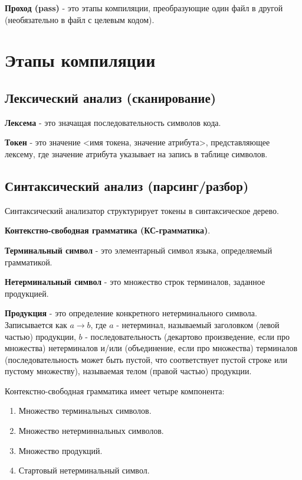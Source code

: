 \documentclass[oneside]{book}
\begin{document}
    \textbf{Проход (pass)} - это этапы компиляции,
    преобразующие один файл в другой
    (необязательно в файл с целевым кодом).

    \section{Этапы компиляции}
    \subsection{Лексический анализ (сканирование)}
    \textbf{Лексема} - это значащая последовательность символов кода.

    \textbf{Токен} - это значение <имя токена, значение атрибута>,
    представляющее лексему, где значение атрибута
    указывает на запись в таблице символов.

    \subsection{Синтаксический анализ (парсинг/разбор)}
    Синтаксический анализатор структурирует токены в синтаксическое дерево.

    \textbf{Контекстно-свободная грамматика (КС-грамматика)}.

    \textbf{Терминальный символ} - это элементарный символ языка,
    определяемый грамматикой.

    \textbf{Нетерминальный символ} - это множество строк терминалов,
    заданное продукцией.

    \textbf{Продукция} - это определение конкретного нетерминального символа.
    Записывается как $ a \rightarrow b $,
    где $ a $ - нетерминал, называемый заголовком
    (левой частью) продукции, $ b $ - последовательность
    (декартово произведение, если про множества)
    нетерминалов и/или (объединение, если про множества) терминалов
    (последовательность может быть пустой, что соответствует пустой строке или
    пустому множеству), называемая телом (правой частью) продукции.

    Контекстно-свободная грамматика имеет четыре компонента:
    \begin{enumerate}
        \item Множество терминальных символов.
        \item Множество нетерминнальных символов.
        \item Множество продукций.
        \item Стартовый нетерминальный символ.
    \end{enumerate}
\end{document}
